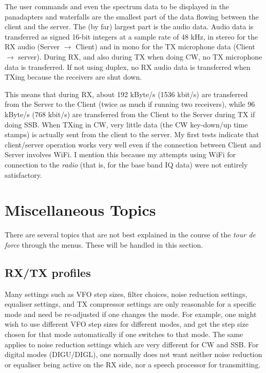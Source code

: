 \documentclass[12pt]{book}
\begin{document}
 The user commands and even the spectrum
data to be displayed in the panadapters and waterfalls are the smallest part of the data flowing between the client
and the server. The (by far) largest part is the audio data. Audio data is transferred as signed 16-bit integers
at a sample rate of 48 kHz, in stereo for the RX audio (Server $\to$ Client) and in mono for the TX
microphone data (Client $\to$ server). During RX, and also during TX when doing CW, no TX microphone data
is transferred. If not using duplex, no RX audio data is transferred when TXing because the receivers are shut down.

This means that during RX, about 192 kByte/s (1536 kbit/s) are transferred from the Server to the Client
(twice as much if running two receivers), while 96 kByte/s (768 kbit/s)  are transferred
from the Client to the Server during
TX if doing SSB. When TXing in CW, very little data (the CW key-down/up time stamps) is actually sent from the client
to the server.
My first tests indicate that client/server operation works very well even
if  the connection between Client and Server
involves WiFi. I mention this because my attempts using WiFi for connection to the \textit{radio}
(that is, for the base band IQ data) were not entirely satisfactory.
\chapter{Miscellaneous Topics}
There are several topics that are not best explained in the course of the \textit{tour de force} through
the menus. These will be handled in this section.

\section{RX/TX profiles}
\label{sec:rxtxprofiles}
Many settings such as VFO step sizes, filter choices, noise reduction
settings, equaliser settings, and TX compressor settings
are only reasonable for a specific mode and need be re-adjusted if one changes
the mode. For example, one might wish to use
different VFO step sizes for different modes, and get the step size chosen for that
mode automatically if one switches to that mode. The same applies to noise reduction
settings which are very different for CW and SSB. For digital modes (DIGU/DIGL),
one normally does not want neither noise reduction or equaliser being active on the RX
side, nor a speech processor for transmitting.
\end{document}
